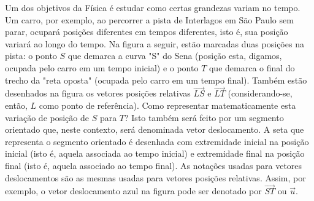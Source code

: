 Um dos objetivos da Física é estudar como certas grandezas variam no tempo. Um carro, por exemplo, ao percorrer a pista de Interlagos em São Paulo sem parar, ocupará posições diferentes em tempos diferentes, isto é, sua posição variará ao longo do tempo. Na figura a seguir, estão marcadas duas posições na pista: o ponto \(S\) que demarca a curva "S"{} do Sena (posição esta, digamos, ocupada pelo carro em um tempo inicial) e o ponto \(T\) que demarca o final do trecho da "reta oposta"{} (ocupada pelo carro em um tempo final). Também estão desenhados na figura os vetores posições relativas \(\overrightarrow{LS}\) e \(\overrightarrow{LT}\) (considerando-se, então, \(L\) como ponto de referência).
Como representar matematicamente esta variação de posição de \(S\) para \(T\)? Isto também será feito por um segmento orientado que, neste contexto, será denominada  vetor deslocamento. A seta que representa o segmento orientado é desenhada com extremidade inicial na posição inicial (isto é, aquela associada ao tempo inicial) e extremidade final na posição final (isto é, aquela associado ao tempo final). As notações usadas para vetores deslocamentos são as mesmas usadas para vetores posições relativas. Assim, por exemplo, o vetor deslocamento azul na figura pode ser denotado por \(\overrightarrow{ST}\) ou \(\vec{u}\).


